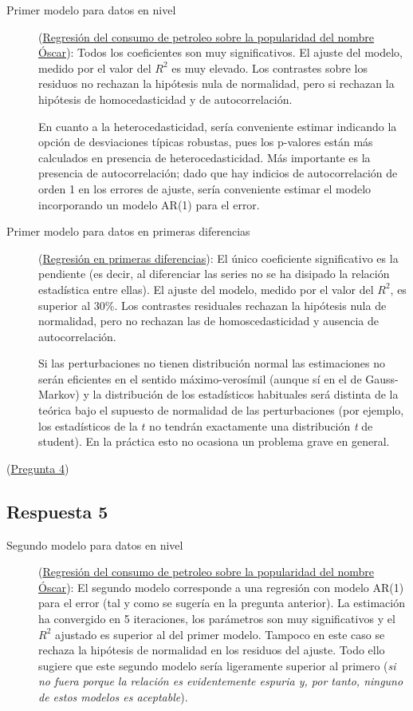 \documentclass[10pt]{article}
\begin{document}
\begin{description}
\item[{Primer modelo para datos en nivel}] (\hyperref[sec:org394923d]{Regresión del consumo de petroleo sobre la popularidad del nombre Óscar}): Todos los
coeficientes son muy significativos. El ajuste del modelo, medido
por el valor del \(R^2\) es muy elevado. Los contrastes sobre los
residuos no rechazan la hipótesis nula de normalidad, pero si
rechazan la hipótesis de homocedasticidad y de autocorrelación.

En cuanto a la heterocedasticidad, sería conveniente estimar
indicando la opción de desviaciones típicas robustas, pues los
p-valores están más calculados en presencia de
heterocedasticidad. Más importante es la presencia de
autocorrelación; dado que hay indicios de autocorrelación de orden 1
en los errores de ajuste, sería conveniente estimar el modelo
incorporando un modelo AR(1) para el error.

\item[{Primer modelo para datos en primeras diferencias}] (\hyperref[sec:org4cb71db]{Regresión en primeras diferencias}): El único coeficiente significativo es la
pendiente (es decir, al diferenciar las series no se ha disipado la
relación estadística entre ellas). El ajuste del modelo, medido por
el valor del \(R^2\), es superior al 30\%. Los contrastes residuales
rechazan la hipótesis nula de normalidad, pero no rechazan las de
homoscedasticidad y ausencia de autocorrelación.

Si las perturbaciones no tienen distribución normal las estimaciones
no serán eficientes en el sentido máximo-verosímil (aunque sí en el
de Gauss-Markov) y la distribución de los estadísticos habituales
será distinta de la teórica bajo el supuesto de normalidad de las
perturbaciones (por ejemplo, los estadísticos de la \(t\) no tendrán
exactamente una distribución \emph{t} de student). En la práctica esto no
ocasiona un problema grave en general.
\end{description}

(\hyperref[sec:org008d150]{Pregunta 4})
\subsection*{Respuesta 5}
\label{sec:orgc2ca6d9}


\begin{description}
\item[{Segundo modelo para datos en nivel}] (\hyperref[sec:org394923d]{Regresión del consumo de petroleo sobre la popularidad del nombre Óscar}): El segundo modelo
corresponde a una regresión con modelo AR(1) para el error (tal y
como se sugería en la pregunta anterior). La estimación ha
convergido en 5 iteraciones, los parámetros son muy significativos y
el \(R^2\) ajustado es superior al del primer modelo. Tampoco en este
caso se rechaza la hipótesis de normalidad en los residuos del
ajuste. Todo ello sugiere que este segundo modelo sería ligeramente
superior al primero (\emph{si no fuera porque la relación es
evidentemente espuria y, por tanto, ninguno de estos modelos es
aceptable}).
\end{description}
\end{document}
